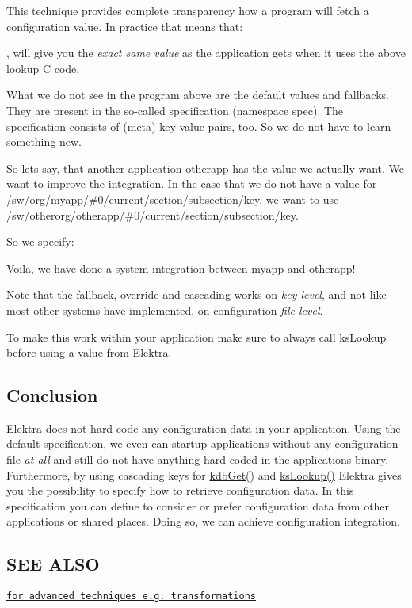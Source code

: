 This technique provides complete transparency how a program will fetch a configuration value. In practice that means that\+:




, will give you the {\itshape exact same value} as the application gets when it uses the above lookup C code.

What we do not see in the program above are the default values and fallbacks. They are present in the so-\/called specification (namespace {\ttfamily spec}). The specification consists of (meta) key-\/value pairs, too. So we do not have to learn something new.

So lets say, that another application {\ttfamily otherapp} has the value we actually want. We want to improve the integration. In the case that we do not have a value for {\ttfamily /sw/org/myapp/\#0/current/section/subsection/key}, we want to use {\ttfamily /sw/otherorg/otherapp/\#0/current/section/subsection/key}.

So we specify\+:




Voila, we have done a system integration between {\ttfamily myapp} and {\ttfamily otherapp}!

Note that the fallback, override and cascading works on {\itshape key level}, and not like most other systems have implemented, on configuration {\itshape file level}.

To make this work within your application make sure to always call {\ttfamily ks\+Lookup} before using a value from Elektra.

\subsection*{Conclusion}

Elektra does not hard code any configuration data in your application. Using the {\ttfamily default} specification, we even can startup applications without any configuration file {\itshape at all} and still do not have anything hard coded in the applications binary. Furthermore, by using cascading keys for {\ttfamily \hyperlink{group__kdb_ga28e385fd9cb7ccfe0b2f1ed2f62453a1}{kdb\+Get()}} and {\ttfamily \hyperlink{group__keyset_gaa34fc43a081e6b01e4120daa6c112004}{ks\+Lookup()}} Elektra gives you the possibility to specify how to retrieve configuration data. In this specification you can define to consider or prefer configuration data from other applications or shared places. Doing so, we can achieve configuration integration.

\subsection*{S\+EE A\+L\+SO}


\begin{DoxyItemize}
\item \href{https://www.libelektra.org/ftp/elektra/publications/raab2015sharing.pdf}{\tt for advanced techniques e.\+g. transformations} 
\end{DoxyItemize}